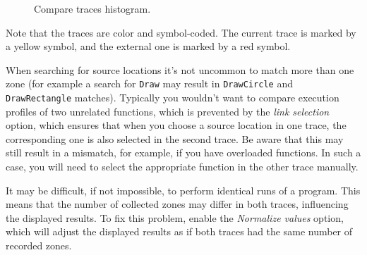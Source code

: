 \documentclass[hidelinks,titlepage,a4paper,twoside]{article}
\begin{document}
\begin{figure}[h]
\centering{}
\caption{Compare traces histogram.}
\label{comparehistogram}
\end{figure}

Note that the traces are color and symbol-coded. The current trace is marked by a yellow \faLemon{} symbol, and the external one is marked by a red \faGem{} symbol.

When searching for source locations it's not uncommon to match more than one zone (for example a search for \texttt{Draw} may result in \texttt{DrawCircle} and \texttt{DrawRectangle} matches). Typically you wouldn't want to compare execution profiles of two unrelated functions, which is prevented by the \emph{link selection} option, which ensures that when you choose a source location in one trace, the corresponding one is also selected in the second trace. Be aware that this may still result in a mismatch, for example, if you have overloaded functions. In such a case, you will need to select the appropriate function in the other trace manually.

It may be difficult, if not impossible, to perform identical runs of a program. This means that the number of collected zones may differ in both traces, influencing the displayed results. To fix this problem, enable the \emph{Normalize values} option, which will adjust the displayed results as if both traces had the same number of recorded zones.
\end{document}
